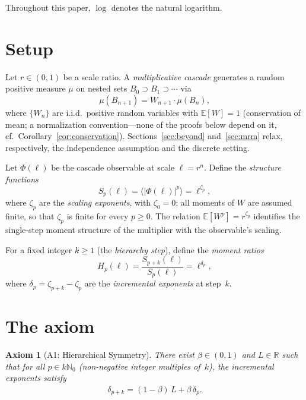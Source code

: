 \documentclass[pdflatex,sn-mathphys-num]{sn-jnl}
\theoremstyle{thmstyleone}
\theoremstyle{thmstyletwo}
\theoremstyle{thmstylethree}
\newtheorem*{axiom}{Axiom}
\begin{document}
\smallskip
Throughout this paper, $\log$ denotes the natural logarithm.


\section{Setup}
\label{sec:setup}

Let $r \in (0,1)$ be a scale ratio.  A \emph{multiplicative cascade}
generates a random positive measure $\mu$ on nested sets $B_0 \supset
B_1 \supset \cdots$ via
\[
  \mu(B_{n+1}) = W_{n+1} \cdot \mu(B_n),
\]
where $\{W_n\}$ are i.i.d.\ positive random variables with
$\mathbb{E}[W] = 1$ (conservation of mean; a normalization
convention---none of the proofs below depend on it, cf.\
Corollary~\ref{cor:conservation}).  Sections~\ref{sec:beyond}
and~\ref{sec:mrm} relax, respectively, the independence assumption
and the discrete setting.

Let $\Phi(\ell)$ be the cascade observable at scale $\ell = r^n$.
Define the \emph{structure functions}
\[
  S_p(\ell) = \langle |\Phi(\ell)|^p \rangle = \ell^{\zeta_p},
\]
where $\zeta_p$ are the \emph{scaling exponents}, with $\zeta_0 = 0$;
all moments of $W$ are assumed finite, so that $\zeta_p$ is finite
for every $p \ge 0$.  The relation $\mathbb{E}[W^p] = r^{\zeta_p}$
identifies the single-step moment structure of the multiplier with
the observable's scaling.

For a fixed integer $k \geq 1$ (the \emph{hierarchy step}), define
the \emph{moment ratios}
\[
  H_p(\ell) = \frac{S_{p+k}(\ell)}{S_p(\ell)} = \ell^{\delta_p},
\]
where $\delta_p = \zeta_{p+k} - \zeta_p$ are the \emph{incremental
exponents} at step~$k$.


\section{The axiom}
\label{sec:axiom}

\begin{axiom}[A1: Hierarchical Symmetry]
There exist $\beta \in (0,1)$ and $L \in \mathbb{R}$ such that for
all $p \in k\mathbb{N}_0$ (non-negative integer multiples of~$k$),
the incremental exponents satisfy
\begin{align}\label{eq:A1}
  \delta_{p+k}
  = (1 - \beta)\,L + \beta\,\delta_p.
  \tag{$*$}
\end{align}
\end{axiom}
\end{document}
